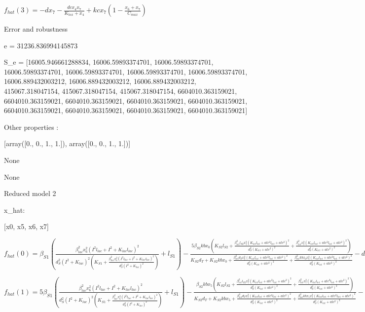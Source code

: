 $f_{hat}(3)=- d x_{7} - \frac{dc x_{4} x_{7}}{K_{tox} + x_{4}} + kc x_{7} \left(1 - \frac{x_{6} + x_{7}}{C_{max}}\right)$



Error and robustness 


e = 31236.836994145873

S_e = [16005.946661288834, 16006.59893374701, 16006.59893374701, 16006.59893374701, 16006.59893374701, 16006.59893374701, 16006.59893374701, 16006.889432003212, 16006.889432003212, 16006.889432003212, 415067.318047154, 415067.318047154, 415067.318047154, 6604010.363159021, 6604010.363159021, 6604010.363159021, 6604010.363159021, 6604010.363159021, 6604010.363159021, 6604010.363159021, 6604010.363159021, 6604010.363159021]

Other properties :


[array([0., 0., 1., 1.]), array([0., 0., 1., 1.])]

None

None

Reduced model 2

x_{hat}: 

[x0, x5, x6, x7]


$f_{hat}(0)=\beta_{S1} \left(\frac{\beta_{lac}^{2} x_{6}^{2} \left(I^{2} l_{lac} + I^{2} + K_{lac} l_{lac}\right)^{2}}{d_{S}^{2} \left(I^{2} + K_{lac}\right)^{2} \left(K_{S1} + \frac{\beta_{lac}^{2} x_{6}^{2} \left(I^{2} l_{lac} + I^{2} + K_{lac} l_{lac}\right)^{2}}{d_{S}^{2} \left(I^{2} + K_{lac}\right)^{2}}\right)} + l_{S1}\right) - \frac{5 \beta_{S2} kb x_{0} \left(K_{S2} l_{S2} + \frac{\beta_{tet}^{2} l_{S2} x_{7}^{2} \left(K_{tet} l_{tet} + atc^{2} l_{tet} + atc^{2}\right)^{2}}{d_{S}^{2} \left(K_{tet} + atc^{2}\right)^{2}} + \frac{\beta_{tet}^{2} x_{7}^{2} \left(K_{tet} l_{tet} + atc^{2} l_{tet} + atc^{2}\right)^{2}}{d_{S}^{2} \left(K_{tet} + atc^{2}\right)^{2}}\right)}{K_{S2} d_{T} + K_{S2} kb x_{0} + \frac{\beta_{tet}^{2} d_{T} x_{7}^{2} \left(K_{tet} l_{tet} + atc^{2} l_{tet} + atc^{2}\right)^{2}}{d_{S}^{2} \left(K_{tet} + atc^{2}\right)^{2}} + \frac{\beta_{tet}^{2} kb x_{0} x_{7}^{2} \left(K_{tet} l_{tet} + atc^{2} l_{tet} + atc^{2}\right)^{2}}{d_{S}^{2} \left(K_{tet} + atc^{2}\right)^{2}}} - d_{T} x_{0}$


$f_{hat}(1)=5 \beta_{S1} \left(\frac{\beta_{lac}^{2} x_{6}^{2} \left(I^{2} l_{lac} + I^{2} + K_{lac} l_{lac}\right)^{2}}{d_{S}^{2} \left(I^{2} + K_{lac}\right)^{2} \left(K_{S1} + \frac{\beta_{lac}^{2} x_{6}^{2} \left(I^{2} l_{lac} + I^{2} + K_{lac} l_{lac}\right)^{2}}{d_{S}^{2} \left(I^{2} + K_{lac}\right)^{2}}\right)} + l_{S1}\right) - \frac{\beta_{S2} kb x_{5} \left(K_{S2} l_{S2} + \frac{\beta_{tet}^{2} l_{S2} x_{7}^{2} \left(K_{tet} l_{tet} + atc^{2} l_{tet} + atc^{2}\right)^{2}}{d_{S}^{2} \left(K_{tet} + atc^{2}\right)^{2}} + \frac{\beta_{tet}^{2} x_{7}^{2} \left(K_{tet} l_{tet} + atc^{2} l_{tet} + atc^{2}\right)^{2}}{d_{S}^{2} \left(K_{tet} + atc^{2}\right)^{2}}\right)}{K_{S2} d_{T} + K_{S2} kb x_{5} + \frac{\beta_{tet}^{2} d_{T} x_{7}^{2} \left(K_{tet} l_{tet} + atc^{2} l_{tet} + atc^{2}\right)^{2}}{d_{S}^{2} \left(K_{tet} + atc^{2}\right)^{2}} + \frac{\beta_{tet}^{2} kb x_{5} x_{7}^{2} \left(K_{tet} l_{tet} + atc^{2} l_{tet} + atc^{2}\right)^{2}}{d_{S}^{2} \left(K_{tet} + atc^{2}\right)^{2}}} - d_{T} x_{5}$


